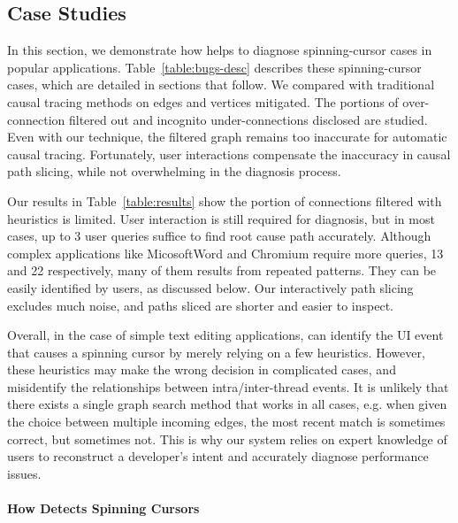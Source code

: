 \subsection{Case Studies}\label{sec:casestudy}

In this section, we demonstrate how \xxx helps to diagnose \nbug spinning-cursor
cases in popular applications. Table~\ref{table:bugs-desc} describes these
spinning-cursor cases, which are detailed in sections that follow. We compared
\xxx with traditional causal tracing methods on edges and vertices mitigated.
The portions of over-connection filtered out and incognito under-connections
disclosed are studied. Even with our technique, the filtered graph remains
too inaccurate for automatic causal tracing. Fortunately, user interactions
compensate the inaccuracy in causal path slicing, while not overwhelming in the
diagnosis process.

Our results in Table~\ref{table:results} show the portion of connections
filtered with heuristics is limited. User interaction is still required for
diagnosis, but in most cases, up to 3 user queries suffice to find root cause
path accurately. Although complex applications 
like MicosoftWord and Chromium
require more queries,
13 and 22 respectively, many of them results from repeated
patterns. They can be easily identified by users, as discussed below. Our
interactively path slicing excludes much noise, and paths sliced are shorter and easier to
inspect.

Overall, in the case of simple text editing applications, \xxx can identify the
UI event that causes a spinning cursor by merely relying on a few heuristics.
However, these heuristics may make the wrong decision in complicated cases, and
misidentify the relationships between intra/inter-thread events. It is unlikely
that there exists a single graph search method that works in all cases, e.g.
when given the choice between multiple incoming edges, the most recent match is
sometimes correct, but sometimes not. This is why our system relies on expert
knowledge of users to reconstruct a developer's intent and accurately diagnose
performance issues.

\paragraph{How \xxx Detects Spinning Cursors}

